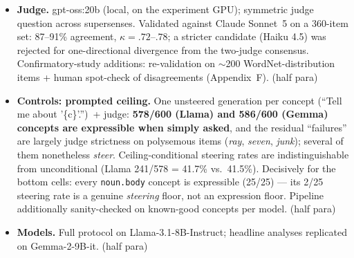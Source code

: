\documentclass[11pt]{article}
\newenvironment{outline}{\color{gray!70!black}\begin{itemize}[leftmargin=1.2em,itemsep=1pt]}{\end{itemize}\color{black}}
\begin{document}
\begin{outline}
\item \textbf{Judge.} gpt-oss:20b (local, on the experiment GPU); symmetric judge question across supersenses. Validated against Claude Sonnet~5 on a 360-item set: 87--91\% agreement, $\kappa = .72$--$.78$; a stricter candidate (Haiku 4.5) was rejected for one-directional divergence from the two-judge consensus. Confirmatory-study additions: re-validation on $\sim$200 WordNet-distribution items + human spot-check of disagreements (Appendix~F). (half para)
\item \textbf{Controls: prompted ceiling.} One unsteered generation per concept (``Tell me about '\{c\}'.'')~+ judge: \textbf{578/600 (Llama) and 586/600 (Gemma) concepts are expressible when simply asked}, and the residual ``failures'' are largely judge strictness on polysemous items (\emph{ray}, \emph{seven}, \emph{junk}); several of them nonetheless \emph{steer}. Ceiling-conditional steering rates are indistinguishable from unconditional (Llama 241/578 = 41.7\% vs.\ 41.5\%). Decisively for the bottom cells: every \texttt{noun.body} concept is expressible (25/25) --- its 2/25 steering rate is a genuine \emph{steering} floor, not an expression floor. Pipeline additionally sanity-checked on known-good concepts per model. (half para)
\item \textbf{Models.} Full protocol on Llama-3.1-8B-Instruct; headline analyses replicated on Gemma-2-9B-it. (half para)
\end{outline}
\end{document}

